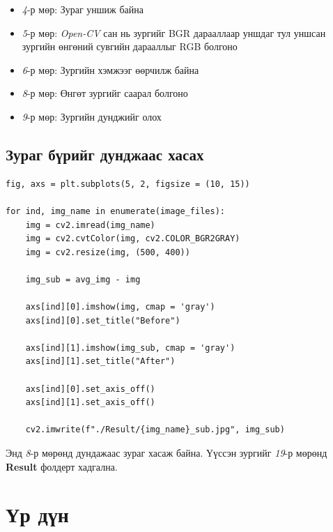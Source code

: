 \documentclass[a4paper]{article}
\begin{document}
\begin{itemize}
\item \textit{4}-р мөр: Зураг уншиж байна
\item \textit{5}-р мөр: \textit{Open-CV} сан нь зургийг BGR дарааллаар уншдаг тул уншсан зургийн өнгөний сувгийн дарааллыг RGB болгоно
\item \textit{6}-р мөр: Зургийн хэмжээг өөрчилж байна
\item \textit{8}-р мөр: Өнгөт зургийг саарал болгоно
\item \textit{9}-р мөр: Зургийн дунджийг олох
\end{itemize}


\subsection{Зураг бүрийг дунджаас хасах}
\begin{lstlisting}
fig, axs = plt.subplots(5, 2, figsize = (10, 15))

for ind, img_name in enumerate(image_files):
    img = cv2.imread(img_name)
    img = cv2.cvtColor(img, cv2.COLOR_BGR2GRAY)
    img = cv2.resize(img, (500, 400))
    
    img_sub = avg_img - img

    axs[ind][0].imshow(img, cmap = 'gray')
    axs[ind][0].set_title("Before")

    axs[ind][1].imshow(img_sub, cmap = 'gray')
    axs[ind][1].set_title("After")

    axs[ind][0].set_axis_off()
    axs[ind][1].set_axis_off()

    cv2.imwrite(f"./Result/{img_name}_sub.jpg", img_sub)
\end{lstlisting}
Энд \textit{8}-р мөрөнд дундажаас зураг хасаж байна.  Үүссэн зургийг \textit{19}-р мөрөнд \textbf{Result} фолдерт хадгална.

\section{Үр дүн}
\end{document}
